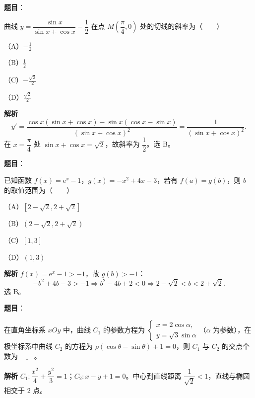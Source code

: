\begin{answer}

\textbf{题目}：

曲线 $y=\dfrac{\sin x}{\sin x+\cos x}-\dfrac12$ 在点 $M\left(\dfrac\pi4,0\right)$ 处的切线的斜率为\mbox{（　　）}

（A）$-\frac12$

（B）$\frac12$

（C）$-\frac{\sqrt2}2$

（D）$\frac{\sqrt2}2$

\textbf{解析}
\nopagebreak[4]
\[y'=\frac{\cos x(\sin x+\cos x)-\sin x(\cos x-\sin x)}{(\sin x+\cos x)^2}
=\frac{1}{(\sin x+\cos x)^2}.\]
在 $x=\dfrac\pi4$ 处 $\sin x+\cos x=\sqrt2$，故斜率为 $\dfrac12$。选 B。


\end{answer}
\begin{answer}

\textbf{题目}：

已知函数 $f(x)=\mathrm e^x-1$，$g(x)=-x^2+4x-3$，若有 $f(a)=g(b)$，则 $b$ 的取值范围为\mbox{（　　）}

（A）$[2-\sqrt2,2+\sqrt2]$

（B）$(2-\sqrt2,2+\sqrt2)$

（C）$[1,3]$

（D）$(1,3)$

\textbf{解析}
$f(x)=\mathrm e^x-1>-1$，故 $g(b)>-1$：
\nopagebreak[4]
\[-b^2+4b-3>-1\Longrightarrow b^2-4b+2<0\Longrightarrow2-\sqrt2<b<2+\sqrt2.\]
选 B。


\end{answer}
\begin{answer}

\textbf{题目}：

在直角坐标系 $xOy$ 中，曲线 $C_1$ 的参数方程为 $\begin{cases}x=2\cos\alpha,\\y=\sqrt3\sin\alpha\end{cases}$（$\alpha$ 为参数），在极坐标系中曲线 $C_2$ 的方程为 $\rho(\cos\theta-\sin\theta)+1=0$，则 $C_1$ 与 $C_2$ 的交点个数为 $\underline{\qquad}$。

\textbf{解析}
$C_1:\dfrac{x^2}4+\dfrac{y^2}3=1$；$C_2:x-y+1=0$。中心到直线距离 $\dfrac1{\sqrt2}<1$，直线与椭圆相交于 $2$ 点。


\end{answer}
